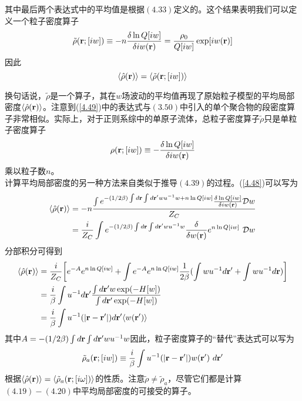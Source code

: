 其中最后两个表达式中的平均值是根据$(4.33)$定义的。这个结果表明我们可以定义一个粒子密度算子\\
\begin{equation}
\tilde{ \rho }(\mathbf{r};[i w]) \equiv -n \frac{\delta \ln Q[i w]}{\delta i w (\mathbf{r})} = \frac{\rho _{0}}{Q[i w]} \exp [i w(\mathbf{r})]
\label{4.49}
\end{equation}
因此\\
\begin{equation}
\langle \hat{ \rho }(\mathbf{r}) \rangle = \langle \tilde{ \rho } (\mathbf{r};[i w ]) \rangle
\end{equation}

换句话说，$\tilde{ \rho }$是一个算子，其在$ w $场波动的平均值再现了原始粒子模型的平均局部密度$ \langle \hat{ \rho }(\mathbf{r}) \rangle $。注意到(\ref{4.49})中的表达式与$(3.50)$中引入的单个聚合物的段密度算子非常相似。实际上，对于正则系综中的单原子流体，总粒子密度算子$ \tilde{ \rho } $只是单粒子密度算子\\
\begin{equation}
\rho (\mathbf{r};[i w]) \equiv - \frac{\delta \ln Q[i w]}{\delta i w (\mathbf{r})}
\end{equation}
乘以粒子数$n$。\\

计算平均局部密度的另一种方法来自类似于推导$(4.39)$的过程。(\ref{4.48})可以写为\\
\begin{equation}
\begin{aligned}
\langle \hat{ \rho } (\mathbf{r}) \rangle &=-n \frac{ \int e^{-(1/2\beta)\int d\mathbf{r} \int d\mathbf{r}'wu^{-1}w+n\ln Q[iw]} \frac{\delta \ln Q[iw]}{\delta iw(\mathbf{r})}\mathcal{D}w} {Z_{C}} \\&= \frac{i}{Z_{C}} \int e^{- (1/2 \beta ) \int d\mathbf{r} \int d\mathbf{r}' w u^{-1} w } \frac{ \delta }{\delta w (\mathbf{r})} e^{n \ln Q[i w ]} ~\mathcal{D} w
\end{aligned}
\end{equation}
分部积分可得到\\
\begin{equation}
\begin{aligned}
\langle \hat{ \rho } (\mathbf{r}) \rangle &=\frac{i}{Z_{C}} \bigg[ e^{-A} e^{n \ln Q[i w ]}+\int e^{-A} e^{n \ln Q[i w ]} \frac{1}{2 \beta}(\int wu^{-1}d\mathbf{r}'+\int wu^{-1}d\mathbf{r}) \bigg ]\\&=\frac{i}{\beta}\int u^{-1} d \mathbf{r}' \frac{\int d\mathbf{r}'w \exp(-H[w])}{\int d\mathbf{r}' \exp(-H[w])} \\&= \frac{i}{ \beta } \int u^{-1} (|\mathbf{r}-\mathbf{r}'|) d\mathbf{r}' \langle w (\mathbf{r}') \rangle 
\end{aligned}
\label{4.53}
\end{equation}
其中$A=-(1/2\beta)\int d\mathbf{r} \int d\mathbf{r}'wu^{-1}w$因此，粒子密度算子的“替代”表达式可以写为\\
\begin{equation}
\tilde{ \rho }_{a}(\mathbf{r};[i w ]) \equiv \frac{i}{ \beta } \int  u^{-1}(|\mathbf{r}-\mathbf{r}'|) w (\mathbf{r}')~d\mathbf{r}'
\label{4.54}
\end{equation}
根据$\langle \hat{ \rho }(\mathbf{r}) \rangle = \langle \tilde{ \rho }_{a}(\mathbf{r};[i \omega ]) \rangle$的性质。注意$\tilde{ \rho } \neq \tilde{ \rho }_{a}$，尽管它们都是计算$(4.19)-(4.20)$中平均局部密度的可接受的算子。\\

